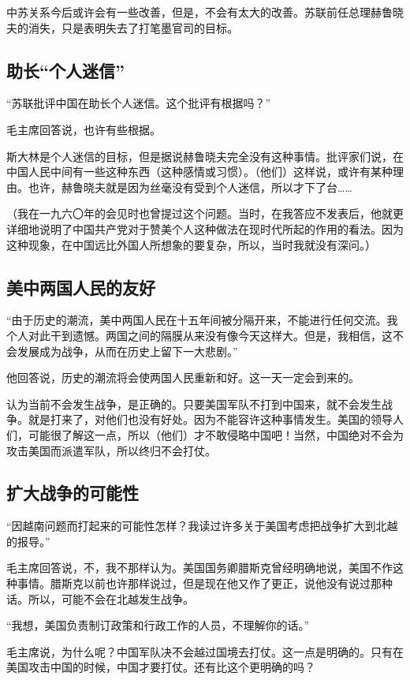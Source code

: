 中苏关系今后或许会有一些改善，但是，不会有太大的改善。苏联前任总理赫鲁晓夫的消失，只是表明失去了打笔墨官司的目标。

\subsection{助长“个人迷信”}

“苏联批评中国在助长个人迷信。这个批评有根据吗？”

毛主席回答说，也许有些根据。

斯大林是个人迷信的目标，但是据说赫鲁晓夫完全没有这种事情。批评家们说，在中国人民中间有一些这种东西（这种感情或习惯）。（他们）这样说，或许有某种理由。也许，赫鲁晓夫就是因为丝毫没有受到个人迷信，所以才下了台……

（我在一九六〇年的会见时也曾提过这个问题。当时，在我答应不发表后，他就更详细地说明了中国共产党对于赞美个人这种做法在现时代所起的作用的看法。因为这种现象，在中国远比外国人所想象的要复杂，所以，当时我就没有深问。）

\subsection{美中两国人民的友好}

“由于历史的潮流，美中两国人民在十五年间被分隔开来，不能进行任何交流。我个人对此干到遗憾。两国之间的隔膜从来没有像今天这样大。但是，我相信，这不会发展成为战争，从而在历史上留下一大悲剧。”

他回答说，历史的潮流将会使两国人民重新和好。这一天一定会到来的。

认为当前不会发生战争，是正确的。只要美国军队不打到中国来，就不会发生战争。就是打来了，对他们也没有好处。因为不能容许这种事情发生。美国的领导人们，可能很了解这一点，所以（他们）才不敢侵略中国吧！当然，中国绝对不会为攻击美国而派遣军队，所以终归不会打仗。

\subsection{扩大战争的可能性}

“因越南问题而打起来的可能性怎样？我读过许多关于美国考虑把战争扩大到北越的报导。”

毛主席回答说，不，我不那样认为。美国国务卿腊斯克曾经明确地说，美国不作这种事情。腊斯克以前也许那样说过，但是现在他又作了更正，说他没有说过那种话。所以，可能不会在北越发生战争。

“我想，美国负责制订政策和行政工作的人员，不理解你的话。”

毛主席说，为什么呢？中国军队决不会越过国境去打仗。这一点是明确的。只有在美国攻击中国的时候，中国才要打仗。还有比这个更明确的吗？

